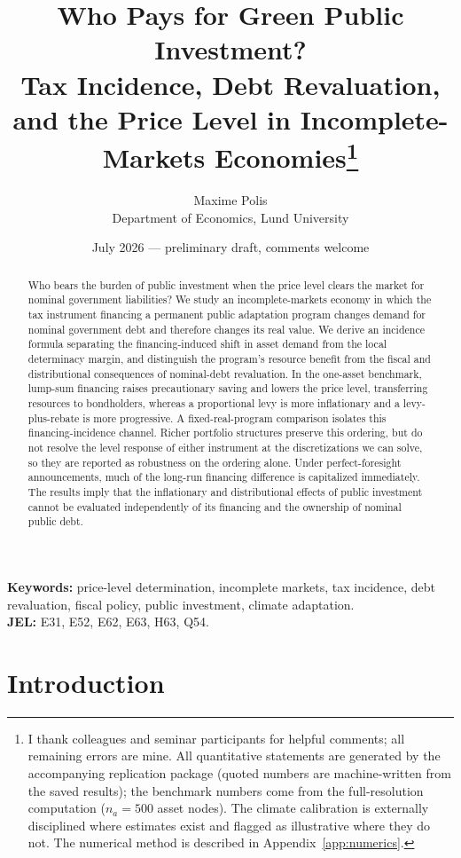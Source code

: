 \documentclass[12pt]{article}
\title{Who Pays for Green Public Investment?\\
{\large Tax Incidence, Debt Revaluation, and the Price Level
in Incomplete-Markets Economies}\thanks{%
I thank colleagues and seminar participants for helpful comments; all
remaining errors are mine. All quantitative statements are generated by the
accompanying replication package (quoted numbers are machine-written from
the saved results); the benchmark numbers come from the full-resolution
computation ($n_a=500$ asset nodes). The climate calibration is
externally disciplined where estimates exist and flagged as illustrative
where they do not. The numerical method is described in
Appendix~\ref{app:numerics}.}}
\author{Maxime Polis\\[2pt]
{\normalsize Department of Economics, Lund University}}
\date{July 2026 --- preliminary draft, comments welcome}
\begin{document}
\maketitle

\begin{abstract}
\noindent
Who bears the burden of public investment when the price level clears the
market for nominal government liabilities? We study an incomplete-markets
economy in which the tax instrument financing a permanent public adaptation
program changes demand for nominal government debt and therefore changes its
real value. We derive an incidence formula separating the financing-induced
shift in asset demand from the local determinacy margin, and distinguish the
program's resource benefit from the fiscal and distributional consequences of
nominal-debt revaluation. In the one-asset benchmark, lump-sum financing
raises precautionary saving and lowers the price level, transferring
resources to bondholders, whereas a proportional levy is more inflationary
and a levy-plus-rebate is more progressive. A fixed-real-program comparison
isolates this financing-incidence channel. Richer portfolio structures
preserve this ordering, but do not resolve the level response of either
instrument at the discretizations we can solve, so they are reported as
robustness on the ordering alone. Under
perfect-foresight announcements, much of the long-run financing difference is
capitalized immediately. The results imply that the inflationary and
distributional effects of public investment cannot be evaluated independently
of its financing and the ownership of nominal public debt.
\end{abstract}

\bigskip
\noindent\textbf{Keywords:} price-level determination, incomplete markets,
tax incidence, debt revaluation, fiscal policy, public investment, climate
adaptation.\\
\textbf{JEL:} E31, E52, E62, E63, H63, Q54.

\newpage

\section{Introduction}\label{sec:intro}
\end{document}
